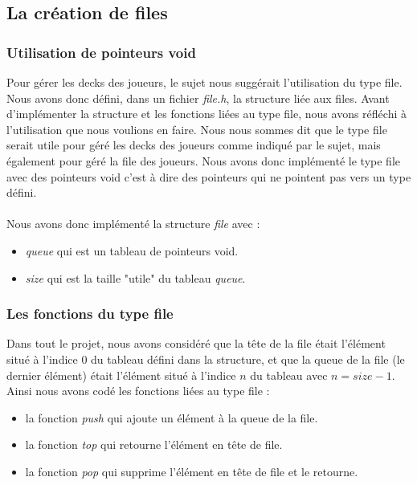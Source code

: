 \documentclass[11pt]{article}
\begin{document}
\subsection{La création de files} \label{subsec: files}
\subsubsection{Utilisation de pointeurs void}
Pour gérer les decks des joueurs, le sujet nous suggérait l'utilisation du type file. Nous avons donc défini, dans un fichier \emph{file.h}, la structure liée aux files. Avant d'implémenter la structure et les fonctions liées au type file, nous avons réfléchi à l'utilisation que nous voulions en faire. Nous nous sommes dit que le type file serait utile pour géré les decks des joueurs comme indiqué par le sujet, mais également pour géré la file des joueurs. Nous avons donc implémenté le type file avec des pointeurs void c'est à dire des pointeurs qui ne pointent pas vers un type défini. \\ \\
Nous avons donc implémenté la structure \emph{file} avec : \\
\begin{itemize}
    \item \emph{queue} qui est un tableau de pointeurs void.
    \item \emph{size} qui est la taille "utile" du tableau \emph{queue}.
\end{itemize}

\subsubsection{Les fonctions du type file}
Dans tout le projet, nous avons considéré que la tête de la file était l'élément situé à l'indice 0 du tableau défini dans la structure, et que la queue de la file (le dernier élément) était l'élément situé à l'indice \(n\) du tableau avec \(n = size - 1\). \\
Ainsi nous avons codé les fonctions liées au type file : \\
\begin{itemize}
    \item la fonction \emph{push} qui ajoute un élément à la queue de la file.
    \item la fonction \emph{top} qui retourne l'élément en tête de file.
    \item la fonction \emph{pop} qui supprime l'élément en tête de file et le retourne. \\
\end{itemize}
\end{document}
